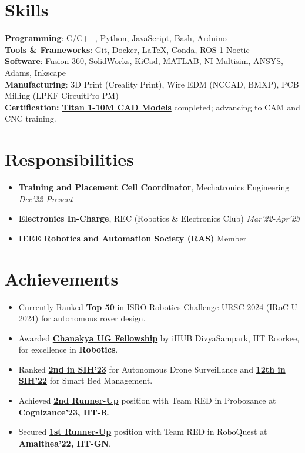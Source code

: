 \documentclass[letterpaper,11pt]{article}
\begin{document}
\section{Skills}
\textbf{Programming}: C/C++, Python, JavaScript, Bash, Arduino \\
\textbf{Tools \& Frameworks}: Git, Docker, \LaTeX, Conda, ROS-1 Noetic \\
\textbf{Software}: Fusion 360, SolidWorks, KiCad, MATLAB, NI Multisim, ANSYS, Adams, Inkscape \\
\textbf{Manufacturing}: 3D Print (Creality Print), Wire EDM (NCCAD, BMXP), PCB Milling (LPKF CircuitPro PM) \\
\textbf{Certification:} \href{https://cncexpert.com/shrijal-patel}{\textbf{Titan 1-10M CAD Models}} completed; advancing to CAM and CNC training.

\section{Responsibilities}
\begin{itemize}[leftmargin=0.5cm,noitemsep]
	\item \textbf{Training and Placement Cell Coordinator}, Mechatronics Engineering \hfill \textit{Dec'22-Present}
	\item \textbf{Electronics In-Charge}, REC (Robotics \& Electronics Club) \hfill \textit{Mar'22-Apr'23}
	\item \textbf{IEEE Robotics and Automation Society (RAS)} Member
\end{itemize}

\section{Achievements}
\begin{itemize}[leftmargin=0.5cm,noitemsep]
	\item Currently Ranked \textbf{Top 50} in ISRO Robotics Challenge-URSC 2024 (IRoC-U 2024) for autonomous rover design.
	\item Awarded \href{https://drive.google.com/file/d/1yf7h17C05ApDbyPZfy2RAE0qosdT2sgE/view?usp=drive_link}{\textbf{Chanakya UG Fellowship}} by iHUB DivyaSampark, IIT Roorkee, for excellence in \textbf{Robotics}.
	\item Ranked \href{https://drive.google.com/file/d/1noEb-wANJrdRMNtVAi0N45UeJD7-bRGy/view?usp=drive_link}{\textbf{2nd in SIH'23}} for Autonomous Drone Surveillance and \href{https://drive.google.com/file/d/16hGFzJzVnpyqvVax0p9HdFs1AQacqK5t/view?usp=drive_link}{\textbf{12th in SIH'22}} for Smart Bed Management.
	\item Achieved \href{https://drive.google.com/file/d/1g-dxeK-y8KmGpw_1KZfBXRY1itVEytIQ/view?usp=drive_link}{\textbf{2nd Runner-Up}} position with Team RED in Probozance at \textbf{Cognizance’23, IIT-R}.
	\item Secured \href{https://drive.google.com/file/d/1CEPW67fjiRTwEeBMc5acCcbCoeJoi-q9/view?usp=drive_link}{\textbf{1st Runner-Up}} position with Team RED in RoboQuest at \textbf{Amalthea’22, IIT-GN}.
\end{itemize}
\end{document}
